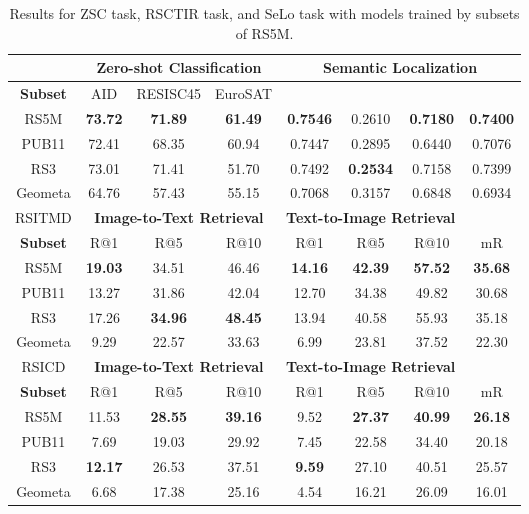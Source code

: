 \documentclass[journal]{IEEEtran}
\begin{document}
\begin{table}[ht]
\caption{Results for ZSC task, RSCTIR task, and SeLo task with models trained by subsets of RS5M.}
\label{table:rs5msubset}
\footnotesize
\setlength{\tabcolsep}{1.75pt}
\begin{tabular}{cccccccc}
\toprule
& \multicolumn{3}{c}{\textbf{Zero-shot Classification}} & \multicolumn{4}{c}{\textbf{Semantic Localization}} \\
\midrule
\textbf{Subset} & AID & RESISC45 & EuroSAT &  &  &  &  \\
\midrule
 RS5M & \textbf{73.72} &  \textbf{71.89} & \textbf{61.49} & \textbf{0.7546} & 0.2610 &\textbf{0.7180} &\textbf{0.7400} \\
 PUB11 &72.41&68.35&60.94	&0.7447& 0.2895	&	0.6440	& 0.7076\\
 RS3 &73.01&71.41&51.70&0.7492&\textbf{0.2534}&0.7158&0.7399 \\
 Geometa &64.76 &57.43 &55.15 &0.7068 & 0.3157 & 0.6848 & 0.6934\\
\midrule
\midrule
RSITMD & \multicolumn{3}{c}{\textbf{Image-to-Text Retrieval}} & \multicolumn{3}{c}{\textbf{Text-to-Image Retrieval}} & \\
\midrule
\textbf{Subset} &  {R@1} & {R@5} & {R@10} & {R@1} & {R@5} & {R@10} & {mR} \\
 \midrule
  RS5M & \textbf{19.03} & 	34.51 & 	46.46	 & \textbf{14.16}	&  \textbf{42.39} & 	\textbf{57.52}  & 	\textbf{35.68}\\
PUB11 &13.27&	31.86	&42.04	&12.70	&34.38	&49.82& 30.68\\
RS3 &17.26 &	\textbf{34.96}&	\textbf{48.45}	&13.94 &	40.58 &	55.93	&35.18\\
Geometa &9.29	&22.57	&33.63	&6.99	&23.81 &	37.52	&22.30\\
\midrule
RSICD & \multicolumn{3}{c}{\textbf{Image-to-Text Retrieval}} & \multicolumn{3}{c}{\textbf{Text-to-Image Retrieval}} & \\
\midrule
\textbf{Subset} &  {R@1} & {R@5} & {R@10} & {R@1} & {R@5} & {R@10} & {mR} \\
 \midrule
  RS5M & 11.53  &	\textbf{28.55} 	& \textbf{39.16}  & 	9.52  & 	\textbf{27.37} 	& \textbf{40.99}  &	\textbf{26.18} \\
PUB11 &7.69&	19.03	&29.92 &	7.45&	22.58&	34.40& 	20.18\\
RS3 &\textbf{12.17}	&26.53&	37.51	&\textbf{9.59}	&27.10 &	40.51 &	25.57\\
Geometa &6.68 &	17.38 &	25.16 &	4.54 &	16.21	&26.09	&16.01\\
\bottomrule
\end{tabular}
\end{table}
\end{document}
